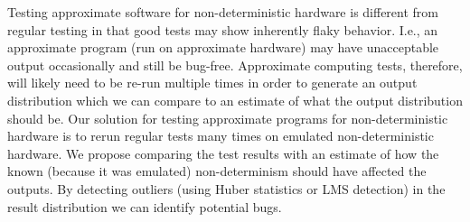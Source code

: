 Testing approximate software for non-deterministic hardware is different from regular testing in that good tests may show inherently flaky behavior. I.e., an approximate program (run on approximate hardware) may have unacceptable output occasionally and still be bug-free. Approximate computing tests, therefore, will likely need to be re-run multiple times in order to generate an output distribution which we can compare to an estimate of what the output distribution should be. Our solution for testing approximate programs for non-deterministic hardware is to rerun regular tests many times on emulated non-deterministic hardware. We propose comparing the test results with an estimate of how the known (because it was emulated) non-determinism should have affected the outputs. By detecting outliers (using Huber statistics or LMS detection) in the result distribution we can identify potential bugs.
